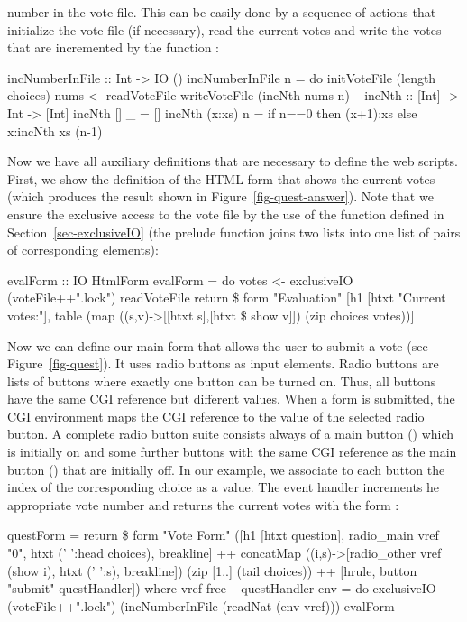 number in the vote file. This can be easily done by a sequence of
actions that initialize the vote file (if necessary), read the current
votes and write the votes that are incremented by the function
:
\begin{prog}
incNumberInFile :: Int -> IO ()
incNumberInFile n = do
  initVoteFile (length choices)
  nums <- readVoteFile
  writeVoteFile (incNth nums n)
~
incNth :: [Int] -> Int -> [Int]
incNth []     _ = []
incNth (x:xs) n = if n==0 then (x+1):xs else x:incNth xs (n-1)
\end{prog}
%
Now we have all auxiliary definitions that are necessary to define
the web scripts. First, we show the definition of
the HTML form  that shows the current votes
(which produces the result shown in Figure~\ref{fig-quest-answer}).
Note that we ensure the exclusive access to the vote file
by the use of the function  defined in
Section~\ref{sec-exclusiveIO}
(the prelude function  joins two lists
into one list of pairs of corresponding elements):
\begin{prog}
evalForm :: IO HtmlForm
evalForm = do
  votes <- exclusiveIO (voteFile++".lock") readVoteFile
  return \$ form "Evaluation"
   [h1 [htxt "Current votes:"],
    table (map ((s,v)->[[htxt s],[htxt \$ show v]])
               (zip choices votes))]
\end{prog}
Now we can define our main form that allows the user to submit a
vote (see Figure~\ref{fig-quest}).
It uses radio buttons as input elements.
\label{radio button}
Radio buttons are lists of buttons where exactly one button
can be turned on. Thus, all buttons have the same CGI reference
but different values. When a form is submitted, the CGI environment
maps the CGI reference to the value of the selected radio button.
A complete radio button suite consists always of a main button
() which is initially on and some further buttons
with the same CGI reference as the main button ()
that are initially off.
In our example, we associate to each button the index of the corresponding
choice as a value. The event handler 
increments he appropriate vote number and returns the current votes
with the form 
:
\begin{prog}
questForm = return \$ form "Vote Form"
  ([h1 [htxt question],
    radio_main vref "0", htxt (' ':head choices), breakline] ++
   concatMap ((i,s)->[radio_other vref (show i), htxt (' ':s), breakline])
             (zip [1..] (tail choices)) ++
   [hrule, button "submit" questHandler])
 where
   vref free
~
   questHandler env = do
     exclusiveIO (voteFile++".lock") (incNumberInFile (readNat (env vref)))
     evalForm
\end{prog}


